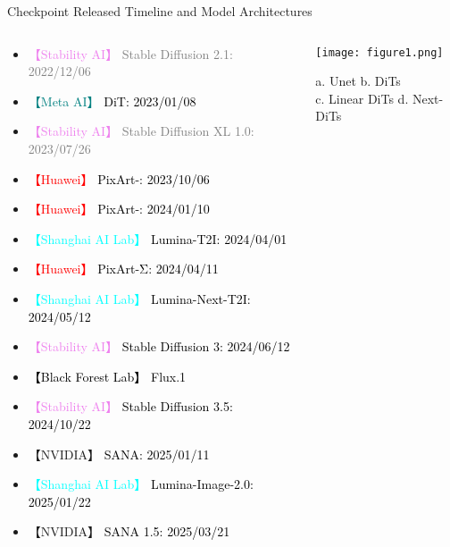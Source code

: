 \begin{refsection}
  \begin{frame}{Checkpoint Released Timeline and Model Architectures}
    \begin{columns}[T,onlytextwidth]
      \begin{column}{0.65\textwidth}
        \begin{itemize}[leftmargin=0.2em]
            \item \textcolor{violet}{【Stability AI】} \textcolor{gray}{Stable Diffusion 2.1: 2022/12/06}
            \item \textcolor{teal}{【Meta AI】} \textcolor{black}{DiT: 2023/01/08}
            \item \textcolor{violet}{【Stability AI】} \textcolor{gray}{Stable Diffusion XL 1.0: 2023/07/26}
            \item \textcolor{red}{【Huawei】} \textcolor{black}{PixArt-\alpha: 2023/10/06}
            \item \textcolor{red}{【Huawei】} \textcolor{black}{PixArt-\delta: 2024/01/10}
            \item \textcolor{cyan}{【Shanghai AI Lab】} \textcolor{black}{Lumina-T2I: 2024/04/01}
            \item \textcolor{red}{【Huawei】} \textcolor{black}{PixArt-Σ: 2024/04/11}
            \item \textcolor{cyan}{【Shanghai AI Lab】} \textcolor{black}{Lumina-Next-T2I: 2024/05/12}
            \item \textcolor{violet}{【Stability AI】} \textcolor{black}{Stable Diffusion 3: 2024/06/12}
            \item \textcolor{black}{【Black Forest Lab】} \textcolor{black}{Flux.1}
            \item \textcolor{violet}{【Stability AI】} \textcolor{black}{Stable Diffusion 3.5: 2024/10/22}
            \item \textcolor{green!70!black}{【NVIDIA】} \textcolor{black}{SANA: 2025/01/11}
            \item \textcolor{cyan}{【Shanghai AI Lab】} \textcolor{black}{Lumina-Image-2.0: 2025/01/22}
            \item \textcolor{green!70!black}{【NVIDIA】} \textcolor{black}{SANA 1.5: 2025/03/21}
        \end{itemize}
      \end{column}
      \begin{column}{0.35\textwidth}
        \centering
        \texttt{[image: figure1.png]}
        \vspace{0.4em}

        {\scriptsize
        a. Unet b. DiTs \\ 
        c. Linear DiTs d. Next-DiTs
        }
      \end{column}
    \end{columns}
    \bottomleftrefs
  \end{frame}
\end{refsection}

